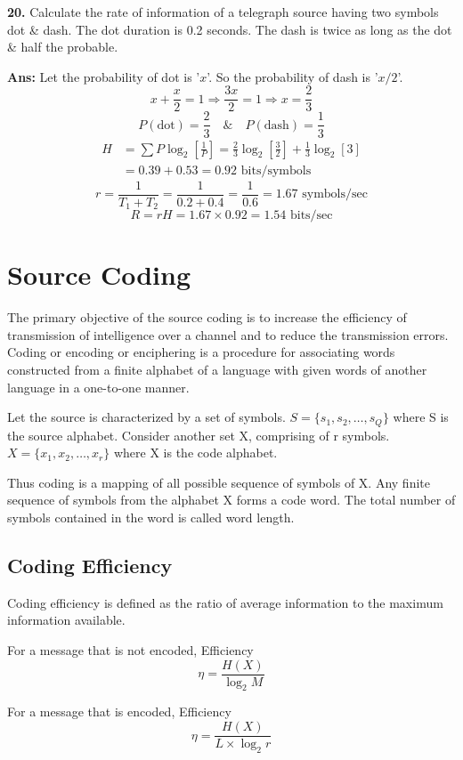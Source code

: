 \documentclass[12pt]{article}
\begin{document}
\vspace{0.5cm}
\noindent \textbf{20.} Calculate the rate of information of a telegraph source having two symbols dot \& dash. The dot duration is 0.2 seconds. The dash is twice as long as the dot \& half the probable.

\textbf{Ans:}
Let the probability of dot is '$x$'. So the probability of dash is '$x/2$'.
$$x + \frac{x}{2} = 1 \Rightarrow \frac{3x}{2} = 1 \Rightarrow x = \frac{2}{3}$$
$$P(\text{dot}) = \frac{2}{3} \quad \& \quad P(\text{dash}) = \frac{1}{3}$$
\begin{align*}
	H & = \sum P \log_2 \left[ \frac{1}{P} \right] = \frac{2}{3}\log_2\left[\frac{3}{2}\right] + \frac{1}{3}\log_2[3] \\
	  & = 0.39 + 0.53 = 0.92 \text{ bits/symbols}
\end{align*}
$$r = \frac{1}{T_1 + T_2} = \frac{1}{0.2 + 0.4} = \frac{1}{0.6} = 1.67 \text{ symbols/sec}$$
$$R = rH = 1.67 \times 0.92 = 1.54 \text{ bits/sec}$$

\section{Source Coding}
The primary objective of the source coding is to increase the efficiency of transmission of intelligence over a channel and to reduce the transmission errors. Coding or encoding or enciphering is a procedure for associating words constructed from a finite alphabet of a language with given words of another language in a one-to-one manner.

Let the source is characterized by a set of symbols. $S = \{s_1, s_2, \ldots, s_Q\}$ where S is the source alphabet.
Consider another set X, comprising of r symbols. $X = \{x_1, x_2, \ldots, x_r\}$ where X is the code alphabet.

Thus coding is a mapping of all possible sequence of symbols of X. Any finite sequence of symbols from the alphabet X forms a code word. The total number of symbols contained in the word is called word length.

\subsection{Coding Efficiency}
Coding efficiency is defined as the ratio of average information to the maximum information available.

For a message that is not encoded, Efficiency
$$\eta = \frac{H(X)}{\log_2 M}$$

For a message that is encoded, Efficiency
$$\eta = \frac{H(X)}{L \times \log_2 r}$$
\end{document}
